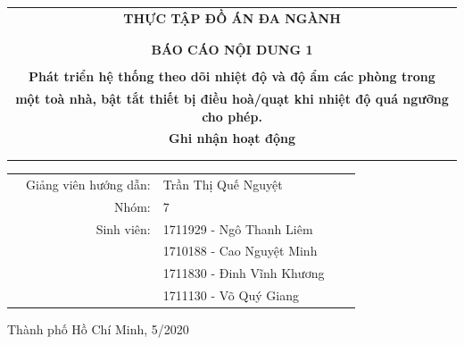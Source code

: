 \begin{titlepage}
\begin{center}
\begin{tabular}{c}
\multicolumn{1}{c}{\textbf{{\Huge THỰC TẬP ĐỒ ÁN ĐA NGÀNH}}}\\
\\ \hline \\
\textbf{{\Large BÁO CÁO NỘI DUNG 1}}\\
\\
\textbf{{\large Phát triển hệ thống theo dõi nhiệt độ và độ ẩm các phòng trong  }}\\
\textbf{{\large một toà nhà, bật tắt thiết bị điều hoà/quạt khi nhiệt độ quá ngưỡng cho phép. }}\\
\textbf{{\large Ghi nhận hoạt động}}\\
\\ \hline \\
\end{tabular}
\end{center}
	\begin{table}[h]
	\begin{tabular}{rrlrr}
		\hspace{5cm} 
		& {\large Giảng viên hướng dẫn}: & {\large Trần Thị Quế Nguyệt} & & \\
		& {\large Nhóm}: & {\large 7} & & \\
		& {\large Sinh viên}: & {\large 1711929 - Ngô Thanh Liêm } \\
		& {} & {\large 1710188 - Cao Nguyệt Minh } \\
		& {} & {\large 1711830 - Đinh Vĩnh Khương } \\
		& {} & {\large 1711130 - Võ Quý Giang} \\
	\end{tabular}
\end{table}

\vspace{3cm}

\begin{center}
{\footnotesize Thành phố Hồ Chí Minh, 5/2020}
\end{center}

\end{titlepage}
